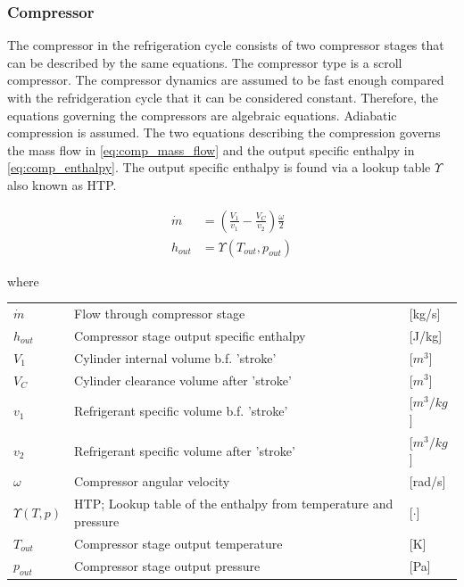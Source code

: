 \subsubsection{Compressor}
The compressor in the refrigeration cycle consists of two compressor stages that can be described by the same equations. The compressor type is a scroll compressor.
The compressor dynamics are assumed to be fast enough compared with the refridgeration cycle that it can be considered constant. Therefore, the equations governing the compressors are algebraic equations.
Adiabatic compression is assumed.
The two equations describing the compression governs the mass flow in \cref{eq:comp_mass_flow} and the output specific enthalpy in \cref{eq:comp_enthalpy}. The output specific enthalpy is found via a lookup table $ \Upsilon $ also known as HTP.

\begin{align}
	\dot{m} &= \left(\frac{V_1}{v_1} - \frac{V_C}{v_2}\right) \frac{\omega}{2} \label{eq:comp_mass_flow} \\
	h_{out} &= \Upsilon(T_{out}, p_{out}) \label{eq:comp_enthalpy}
\end{align}

where

\begin{center}
	\begin{tabular}{l p{8cm} l}
		$\dot{m}$  & Flow through compressor stage                                   & [\si{kg}/\si{s}]     \\
		$h_{out}$  & Compressor stage output specific enthalpy                       & [\si{J}/\si{kg}]     \\
		$V_1$      & Cylinder internal volume b.f. 'stroke'                          & [$\si{m}^3$]         \\
		$V_C$      & Cylinder clearance volume after 'stroke'                        & [$\si{m}^3$]         \\
		$v_1$      & Refrigerant specific volume b.f. 'stroke'                       & [$\si{m}^3/\si{kg}$] \\
		$v_2$      & Refrigerant specific volume after 'stroke'                      & [$\si{m}^3/\si{kg}$] \\
		$\omega$   & Compressor angular velocity                                     & [\si{rad}/\si{s}]    \\
		$\Upsilon(T,p)$ & HTP; Lookup table of the enthalpy from temperature and pressure & [$\cdot]$            \\
		$T_{out}$  & Compressor stage output temperature                             & [\si{K}]             \\
		$p_{out}$  & Compressor stage output pressure                                & [\si{Pa}]
	\end{tabular}
\end{center}

